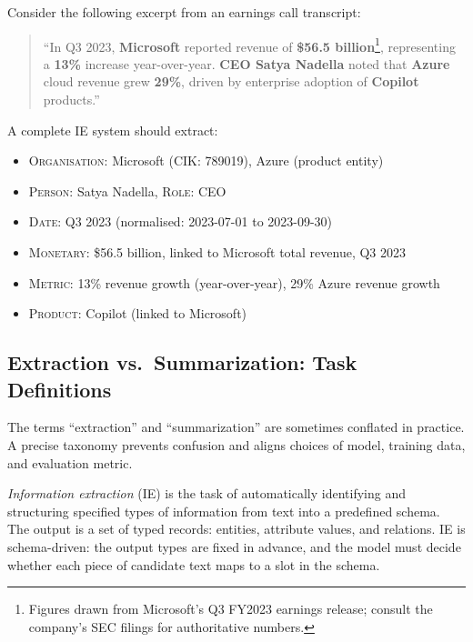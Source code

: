 \begin{example}
\label{ex:entities-earnings-call}
Consider the following excerpt from an earnings call transcript:

\begin{quote}
``In Q3 2023, \textbf{Microsoft} reported revenue of \textbf{\$56.5 billion}\footnote{Figures drawn from Microsoft's Q3 FY2023 earnings release; consult the company's SEC filings for authoritative numbers.},
representing a \textbf{13\%} increase year-over-year. \textbf{CEO Satya Nadella}
noted that \textbf{Azure} cloud revenue grew \textbf{29\%}, driven by enterprise
adoption of \textbf{Copilot} products.''
\end{quote}

A complete IE system should extract:
\begin{itemize}
  \item \textsc{Organisation}: Microsoft (CIK: 789019), Azure (product entity)
  \item \textsc{Person}: Satya Nadella, \textsc{Role}: CEO
  \item \textsc{Date}: Q3 2023 (normalised: 2023-07-01 to 2023-09-30)
  \item \textsc{Monetary}: \$56.5 billion, linked to Microsoft total revenue, Q3 2023
  \item \textsc{Metric}: 13\% revenue growth (year-over-year), 29\% Azure revenue growth
  \item \textsc{Product}: Copilot (linked to Microsoft)
\end{itemize}
\end{example}

\subsection{Extraction vs.\ Summarization: Task Definitions}
\label{sec:ch14-extraction-vs-summarization}

The terms ``extraction'' and ``summarization'' are sometimes conflated in practice. A
precise taxonomy prevents confusion and aligns choices of model, training data, and
evaluation metric.

\begin{definition}
\label{def:information-extraction}
\emph{Information extraction} (IE) is the task of automatically identifying and
structuring specified types of information from text into a predefined schema. The output
is a set of typed records: entities, attribute values, and relations. IE is schema-driven:
the output types are fixed in advance, and the model must decide whether each piece of
candidate text maps to a slot in the schema.
\end{definition}

